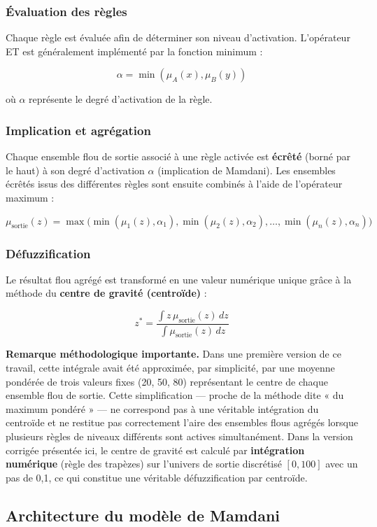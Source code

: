 \documentclass[a4paper,12pt]{report} %
\begin{document}
\subsubsection{Évaluation des règles}
Chaque règle est évaluée afin de déterminer son niveau d'activation. L'opérateur ET est généralement implémenté par la fonction minimum :

\[
\alpha = \min(\mu_A(x), \mu_B(y))
\]

où \(\alpha\) représente le degré d'activation de la règle.

\subsubsection{Implication et agrégation}
Chaque ensemble flou de sortie associé à une règle activée est \textbf{écrêté} (borné par le haut) à son degré d'activation \(\alpha\) (implication de Mamdani). Les ensembles écrêtés issus des différentes règles sont ensuite combinés à l'aide de l'opérateur maximum :

\[
\mu_{\text{sortie}}(z) = \max\Big(\min(\mu_1(z), \alpha_1), \min(\mu_2(z), \alpha_2), \ldots, \min(\mu_n(z), \alpha_n)\Big)
\]

\subsubsection{Défuzzification}
Le résultat flou agrégé est transformé en une valeur numérique unique grâce à la méthode du \textbf{centre de gravité (centroïde)} :

\[
z^* = \frac{\int z \, \mu_{\text{sortie}}(z) \, dz}{\int \mu_{\text{sortie}}(z) \, dz}
\]

\textbf{Remarque méthodologique importante.} Dans une première version de ce travail, cette intégrale avait été approximée, par simplicité, par une moyenne pondérée de trois valeurs fixes (20, 50, 80) représentant le centre de chaque ensemble flou de sortie. Cette simplification — proche de la méthode dite « du maximum pondéré » — ne correspond pas à une véritable intégration du centroïde et ne restitue pas correctement l'aire des ensembles flous agrégés lorsque plusieurs règles de niveaux différents sont actives simultanément. Dans la version corrigée présentée ici, le centre de gravité est calculé par \textbf{intégration numérique} (règle des trapèzes) sur l'univers de sortie discrétisé \([0,100]\) avec un pas de 0,1, ce qui constitue une véritable défuzzification par centroïde.

\subsection{Architecture du modèle de Mamdani}
\end{document}
